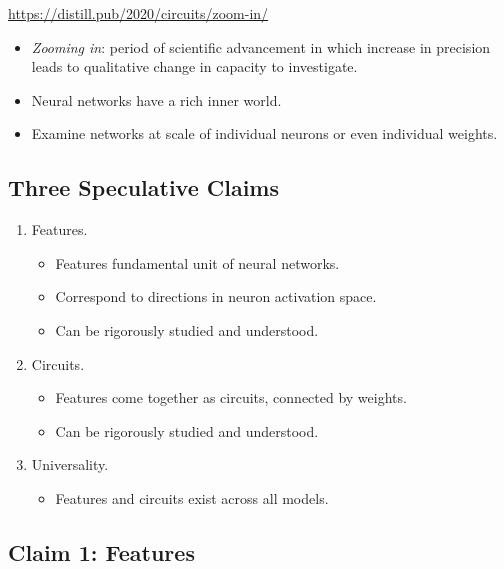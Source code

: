 \url{https://distill.pub/2020/circuits/zoom-in/}

\begin{itemize}
    \item \emph{Zooming in}: period of scientific advancement in which increase in precision leads to qualitative change in capacity to investigate.
    \item Neural networks have a rich inner world.
    \item Examine networks at scale of individual neurons or even individual weights.
\end{itemize}


\subsection{Three Speculative Claims}

\begin{enumerate}[label={\bfseries Claim \arabic*.}, leftmargin=*, labelindent=3pt]
    \item Features.
    \begin{itemize}[leftmargin=-10pt]
        \item Features fundamental unit of neural networks.
        \item Correspond to directions in neuron activation space.
        \item Can be rigorously studied and understood.
    \end{itemize}
    \item Circuits.
    \begin{itemize}[leftmargin=-10pt]
        \item Features come together as circuits, connected by weights.
        \item Can be rigorously studied and understood.
    \end{itemize}
    \item Universality.
    \begin{itemize}[leftmargin=-10pt]
        \item Features and circuits exist across all models.
    \end{itemize}
\end{enumerate}


\subsection{Claim 1: Features}

